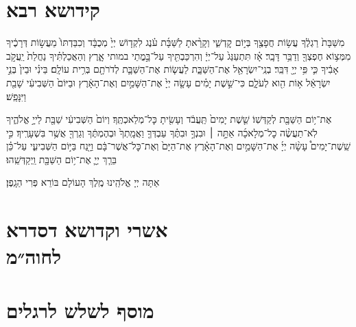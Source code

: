 \documentclass[twoside, openany, parskip=half, 11pt]{book}
\begin{document}
%

\mournerskaddish
\adonolam

\chapter[קידושא רבא לשבת]{ קידושא רבא }

מִשַּׁבָּת֙ רַגְלֶ֔ךָ עֲשׂ֥וֹת חֲפָצֶ֖ךָ בְּי֣וֹם קׇדְשִׁ֑י וְקָרָ֨אתָ לַשַּׁבָּ֜ת עֹ֗נֶג לִקְד֤וֹשׁ יְיָ֙ מְכֻבָּ֔ד וְכִבַּדְתּוֹ֙ מֵעֲשׂ֣וֹת דְּרָכֶ֔יךָ מִמְּצ֥וֹא חֶפְצְךָ֖ וְדַבֵּ֥ר דָּבָֽר׃ אָ֗ז תִּתְעַנַּג֙ עַל־יְיָ֔ וְהִרְכַּבְתִּ֖יךָ עַל־בָּ֣מֳתֵי במותי אָ֑רֶץ וְהַאֲכַלְתִּ֗יךָ נַחֲלַת֙ יַֽעֲקֹ֣ב אָבִ֔יךָ כִּ֛י פִּ֥י יְיָ֖ דִּבֵּֽר׃
בְנֵֽי־יִשְׂרָאֵ֖ל אֶת־הַשַּׁבָּ֑ת לַעֲשׂ֧וֹת אֶת־הַשַּׁבָּ֛ת לְדֹרֹתָ֖ם בְּרִ֥ית עוֹלָֽם׃ בֵּינִ֗י וּבֵין֙ בְּנֵ֣י יִשְׂרָאֵ֔ל א֥וֹת הִ֖וא לְעֹלָ֑ם כִּי־שֵׁ֣שֶׁת יָמִ֗ים עָשָׂ֤ה יְיָ֙ אֶת־הַשָּׁמַ֣יִם וְאֶת־הָאָ֔רֶץ וּבַיּוֹם֙ הַשְּׁבִיעִ֔י שָׁבַ֖ת וַיִּנָּפַֽשׁ׃

אֶת־י֥וֹם הַשַּׁבָּ֖ת לְקַדְּשֽׁוֹ׃ שֵׁ֤שֶׁת יָמִים֙ תַּֽעֲבֹ֔ד וְעָשִׂ֖יתָ כׇּל־מְלַאכְתֶּֽךָ׃ וְיוֹם֙ הַשְּׁבִיעִ֔י שַׁבָּ֖ת לַייָ֣ אֱלֹהֶ֑יךָ לֹֽא־תַעֲשֶׂ֨ה כׇל־מְלָאכָ֜ה אַתָּ֣ה ׀ וּבִנְךָ֣ וּבִתֶּ֗ךָ עַבְדְּךָ֤ וַאֲמָֽתְךָ֙ וּבְהֶמְתֶּ֔ךָ וְגֵרְךָ֖ אֲשֶׁ֥ר בִּשְׁעָרֶֽיךָ׃ כִּ֣י שֵֽׁשֶׁת־יָמִים֩ עָשָׂ֨ה יְיָ֜ אֶת־הַשָּׁמַ֣יִם וְאֶת־הָאָ֗רֶץ אֶת־הַיָּם֙ וְאֶת־כׇּל־אֲשֶׁר־בָּ֔ם וַיָּ֖נַח בַּיּ֣וֹם הַשְּׁבִיעִ֑י עַל־כֵּ֗ן בֵּרַ֧ךְ יְיָ֛ אֶת־י֥וֹם הַשַּׁבָּ֖ת וַֽיְקַדְּשֵֽׁהוּ׃

\savri
{}
אַתָּה יְיָ אֱלֹהֵֽינוּ מֶֽלֶךְ הָעוֹלָם בּוֹרֵא פְּרִי הַגָֽפֶן׃

\chapter[אשרי וקדושא דסדרא לחוה״מ]{ אשרי וקדושא דסדרא \\ לחוה״מ}

\ashrei

\uvaletzion

\chapter[מוסף לשלש רגלים]{ מוסף לשלש לרגלים ‎}
\label{musaphregel}

\end{document}
